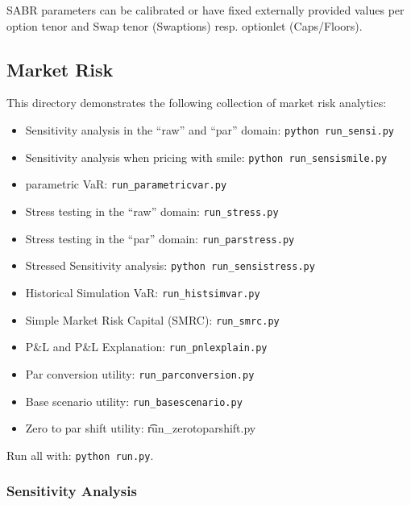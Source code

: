 SABR parameters can be calibrated or have fixed externally provided values
per option tenor and Swap tenor (Swaptions) resp. optionlet (Caps/Floors).

\subsection{Market Risk}\label{example:marketrisk}

This directory demonstrates the following collection of market risk analytics:
\begin{itemize}
\item Sensitivity analysis in the ``raw'' and ``par'' domain: {\tt python run\_sensi.py}
\item Sensitivity analysis when pricing with smile: {\tt python run\_sensismile.py}
\item parametric VaR: {\tt run\_parametricvar.py}
\item Stress testing in the ``raw'' domain: {\tt run\_stress.py}
\item Stress testing in the ``par'' domain: {\tt run\_parstress.py}
\item Stressed Sensitivity analysis: {\tt python run\_sensistress.py}
\item Historical Simulation VaR: {\tt run\_histsimvar.py}
\item Simple Market Risk Capital (SMRC): {\tt run\_smrc.py}
\item P\&L and P\&L Explanation: {\tt run\_pnlexplain.py}
\item Par conversion utility: {\tt run\_parconversion.py}
\item Base scenario utility: {\tt run\_basescenario.py}
\item Zero to par shift utility: {\t run\_zerotoparshift.py}
\end{itemize}

Run all with: {\tt python run.py}.

\subsubsection{Sensitivity Analysis}
\label{example:marketrisk_sensi}

